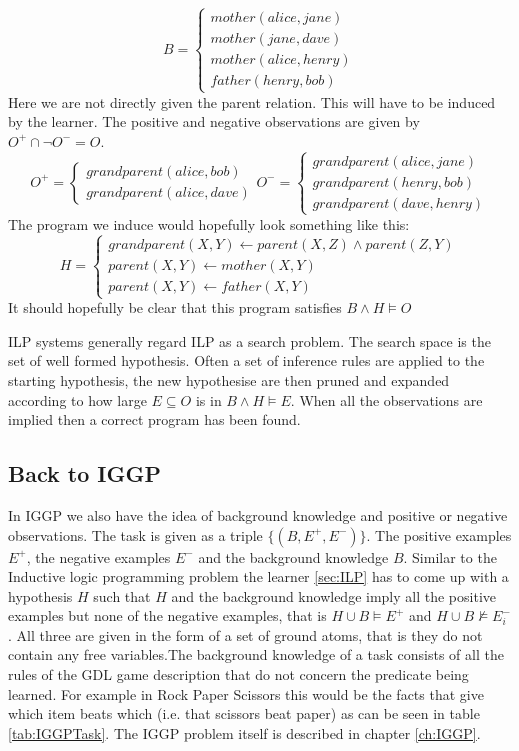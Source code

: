 \[
B=
\begin{cases}
mother(alice,jane)\\
mother(jane,dave)\\
mother(alice,henry)\\
father(henry,bob)
\end{cases}
\]
Here we are not directly given the parent relation. This will have to be induced by the learner. The positive and negative observations are given by $O^+ \cap \neg O^- = O$.
\[
O^+=
\begin{cases}
grandparent(alice,bob)\\
grandparent(alice,dave)
\end{cases}
O^-=
\begin{cases}
grandparent(alice,jane)\\
grandparent(henry,bob)\\
grandparent(dave,henry)
\end{cases}
\]
The program we induce would hopefully look something like this:
\[H=\begin{cases}
grandparent(X,Y) \leftarrow parent(X,Z) \wedge parent(Z,Y)\\
parent(X,Y) \leftarrow mother(X,Y)\\
parent(X,Y) \leftarrow father(X,Y)
\end{cases}\]
It should hopefully be clear that this program satisfies $B \wedge H \vDash O$

ILP systems generally regard ILP as a search problem. The search space is the set of well formed hypothesis. Often a set of inference rules are applied to the starting hypothesis, the new hypothesise are then pruned and expanded according to how large $E\subseteq O$ is in $B \wedge H \vDash E$. When all the observations are implied then a correct program has been found.

\subsection{Back to IGGP}

In IGGP we also have the idea of background knowledge and positive or negative observations. The task is given as a triple $\{(B,E^+,E^-)\}$. The positive examples $E^+$, the negative examples  $E^-$ and the background knowledge $B$. Similar to the Inductive logic programming problem the learner \ref{sec:ILP} has to come up with a hypothesis $H$ such that $H$ and the background knowledge imply all the positive examples but none of the negative examples, that is $H \cup B \models E^+$ and $H \cup B \not\models E_i^-$. All three are given in the form of a set of ground atoms, that is they do not contain any free variables.The background knowledge of a task consists of all the rules of the GDL game description that do not concern the predicate being learned. For example in Rock Paper Scissors this would be the facts that give which item beats which (i.e. that scissors beat paper) as can be seen in table \ref{tab:IGGPTask}. The IGGP problem itself is described in chapter \ref{ch:IGGP}.

